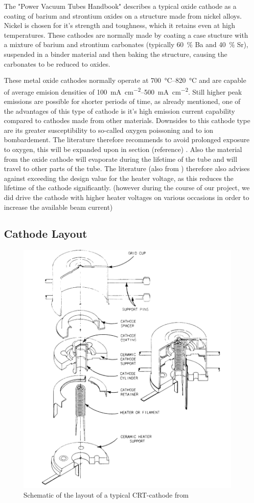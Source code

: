 The "Power Vacuum Tubes Handbook" \cite{PowerTubes323Avadhanulu} describes a typical oxide cathode as a coating of barium and strontium oxides on a structure made from nickel alloys. Nickel is chosen for it's strength and toughness, which it retains even at high temperatures. These cathodes are normally made by coating a case stucture with a mixture of barium and strontium carbonates (typically \SI{60}{\percent} Ba and \SI{40}{\percent} Sr), suspended in a binder material and then baking the structure, causing the carbonates to be reduced to oxides.

These metal oxide cathodes normally operate at \SIrange{700}{820}{\celsius} and are capable of average emision densities of \SIrange{100}{500}{\milli\ampere\per\centi\meter\squared}. Still higher peak emissions are possible for shorter periods of time, as already mentioned, one of the advantages of this type of cathode is it's high emission current capability compared to cathodes made from other materials. Downsides to this cathode type are its greater susceptibility to so-called oxygen poissoning and to ion bombardement. The literature therefore recommends to avoid prolonged exposure to oxygen, this will be expanded upon in section (reference) . Also the material from the oxide cathode will evaporate during the lifetime of the tube and will travel to other parts of the tube. The literature (also from \cite{PowerTubes323Avadhanulu}) therefore also advises against exceeding the design value  for the heater voltage, as this reduces the lifetime of the cathode significantly. (however during the course of our project, we did drive the cathode with higher heater voltages on various occasions in order to increase the available beam current)

\subsection{Cathode Layout} 

\begin{figure}
	\centering
	\includegraphics[width=0.6\linewidth]{Chapters/CRT-Basics/Cathode_layout}
	\caption{Schematic of the layout of a typical CRT-cathode from \cite{deVere69}}
	\label{fig:cathodelayout}
\end{figure}














